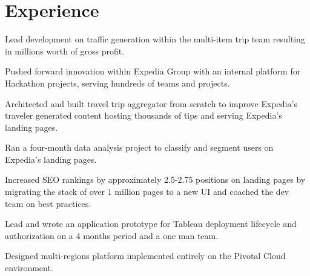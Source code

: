 \documentclass[letterpaper]{deedy-resume} %
\begin{document}
\begin{minipage}[t]{0.66\textwidth} %


\section{Experience}


\hspace{\topsep}
\vspace{\topsep} %

\begin{tightitemize}
\item Lead development on traffic generation within the multi-item trip team resulting in millions 
worth of gross profit.
\item Pushed forward innovation within Expedia Group with an internal platform for Hackathon projects, 
serving hundreds of teams and projects.
\item Architected and built travel trip aggregator from scratch to improve Expedia’s traveler 
generated content hosting thousands of tips and serving Expedia's landing pages.
\end{tightitemize}

\hspace{\topsep}
\begin{tightitemize}
\item Ran a four-month data analysis project to classify and segment users on Expedia’s landing pages.
\item Increased SEO rankings by approximately 2.5-2.75 positions on landing pages by migrating the 
stack of over 1 million pages to a new UI and coached the dev team on best practices.
\end{tightitemize}

\sectionspace %


\begin{tightitemize}
\item Lead and wrote an application prototype for Tableau deployment lifecycle and authorization
on a 4 months period and a one man team.
\item Designed multi-regions platform implemented entirely on the Pivotal Cloud environment.
\end{tightitemize}


\end{minipage}
\end{document}
